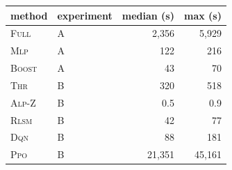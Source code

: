 \begin{tabular}{llrr}
\toprule
method & experiment & median (s) & max (s) \\
\midrule
\textsc{Full} & A & 2{,}356 & 5{,}929 \\
\textsc{Mlp} & A & 122 & 216 \\
\textsc{Boost} & A & 43 & 70 \\
\textsc{Thr} & B & 320 & 518 \\
\textsc{Alp-Z} & B & 0.5 & 0.9 \\
\textsc{Rlsm} & B & 42 & 77 \\
\textsc{Dqn} & B & 88 & 181 \\
\textsc{Ppo} & B & 21{,}351 & 45{,}161 \\
\bottomrule
\end{tabular}
